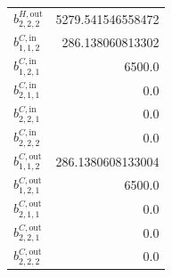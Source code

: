 \documentclass{article}%
\begin{document}
\begin{multicols*}{3}
\begin{supertabular}{lr}
	$b_{2,2,2}^{H,\text{out}}$ & 5279.541546558472 \\%
	$b_{1,1,2}^{C,\text{in}}$ & 286.138060813302 \\%
	$b_{1,2,1}^{C,\text{in}}$ & 6500.0 \\%
	$b_{2,1,1}^{C,\text{in}}$ & 0.0 \\%
	$b_{2,2,1}^{C,\text{in}}$ & 0.0 \\%
	$b_{2,2,2}^{C,\text{in}}$ & 0.0 \\%
	$b_{1,1,2}^{C,\text{out}}$ & 286.1380608133004 \\%
	$b_{1,2,1}^{C,\text{out}}$ & 6500.0 \\%
	$b_{2,1,1}^{C,\text{out}}$ & 0.0 \\%
	$b_{2,2,1}^{C,\text{out}}$ & 0.0 \\%
	$b_{2,2,2}^{C,\text{out}}$ & 0.0 \\%
\end{supertabular}%
\end{multicols*}%
\end{document}
